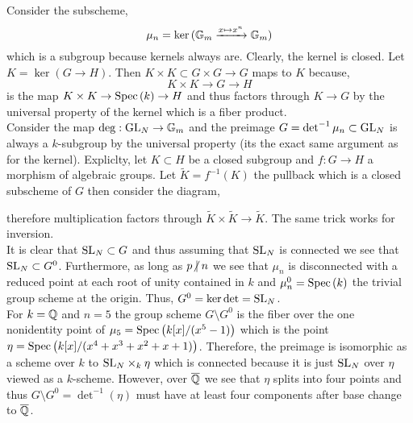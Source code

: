 \documentclass[12pt]{article}
\begin{document}
Consider the subscheme,
\[ \mu_n = \ker{(\mathbb{G}_m\xrightarrow{x \mapsto x^n} \mathbb{G}_m)} \]
which is a subgroup because kernels always are. Clearly, the kernel is closed. Let $K = \ker{(G \to H)}$. Then $K \times K \subset G \times G \to G$ maps to $K$ because,
\[ K \times K \to G \to H \]
is the map $K \times K \to \mathrm{Spec}\left( k \right) \to H$ and thus factors through $K \to G$ by the universal property of the kernel which is a fiber product. 
\bigskip\\
Consider the map $\deg : \mathrm{GL}_N \to \mathbb{G}_m$ and the preimage $G = \det^{-1}{\mu_n} \subset \mathrm{GL}_N$ is always a $k$-subgroup by the universal property (its the exact same argument as for the kernel). Expliclty, let $K \subset H$ be a closed subgroup and $f : G \to H$ a morphism of algebraic groups. Let $\tilde{K} = f^{-1}(K)$ the pullback which is a closed subscheme of $G$ then consider the diagram,
\begin{center}
\end{center}
therefore multiplication factors through $\tilde{K} \times \tilde{K} \to \tilde{K}$. The same trick works for inversion. 
\bigskip\\
It is clear that $\mathrm{SL}_N \subset G$ and thus assuming that $\mathrm{SL}_N$ is connected we see that $\mathrm{SL}_N \subset G^0$. Furthermore, as long as $p \ndivides n$ we see that $\mu_n$ is disconnected with a reduced point at each root of unity contained in $k$ and $\mu_n^0 = \mathrm{Spec}\left( k \right)$ the trivial group scheme at the origin. Thus, $G^0 = \ker{\det} = \mathrm{SL}_N$. 
\bigskip\\
For $k = \mathbb{Q}$ and $n = 5$ the group scheme $G \setminus G^0$ is the fiber over the one nonidentity point of $\mu_5 = \mathrm{Spec}\left( k[x]/(x^5 - 1) \right)$ which is the point $\eta = \mathrm{Spec}\left( k[x]/(x^4 + x^3 + x^2 + x + 1) \right)$. Therefore, the preimage is isomorphic as a scheme over $k$ to $\mathrm{SL}_N \times_k \eta$ which is connected because it is just $\mathrm{SL}_N$ over $\eta$ viewed as a $k$-scheme. However, over $\overline{\mathbb{Q}}$ we see that $\eta$ splits into four points and thus $G \setminus G^0 = \det^{-1}(\eta)$ must have at least four components after base change to $\overline{\mathbb{Q}}$.
\end{document}
